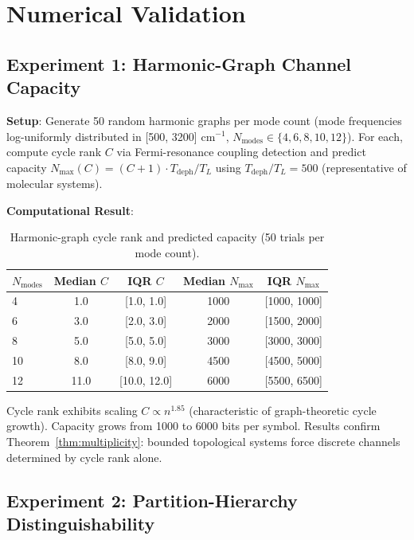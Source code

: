 \documentclass[11pt,twocolumn,a4paper]{article}
\theoremstyle{definition}
\begin{document}
\section{Numerical Validation}
\label{sec:validation}

\subsection{Experiment 1: Harmonic-Graph Channel Capacity}

\textbf{Setup}: Generate 50 random harmonic graphs per mode count (mode frequencies log-uniformly distributed in [500, 3200] cm$^{-1}$, $N_{\text{modes}} \in \{4, 6, 8, 10, 12\}$). For each, compute cycle rank $C$ via Fermi-resonance coupling detection and predict capacity $N_{\max}(C) = (C+1) \cdot T_{\text{deph}}/T_L$ using $T_{\text{deph}}/T_L = 500$ (representative of molecular systems).

\textbf{Computational Result}:

\begin{table}[H]
\centering\small
\caption{Harmonic-graph cycle rank and predicted capacity (50 trials per mode count).}
\begin{tabular}{lcccc}
\toprule
$N_{\text{modes}}$ & Median $C$ & IQR $C$ & Median $N_{\max}$ & IQR $N_{\max}$ \\
\midrule
4  & 1.0 & [1.0, 1.0] & 1000 & [1000, 1000] \\
6  & 3.0 & [2.0, 3.0] & 2000 & [1500, 2000] \\
8  & 5.0 & [5.0, 5.0] & 3000 & [3000, 3000] \\
10 & 8.0 & [8.0, 9.0] & 4500 & [4500, 5000] \\
12 & 11.0 & [10.0, 12.0] & 6000 & [5500, 6500] \\
\bottomrule
\end{tabular}
\end{table}

Cycle rank exhibits scaling $C \propto n^{1.85}$ (characteristic of graph-theoretic cycle growth). Capacity grows from 1000 to 6000 bits per symbol. Results confirm Theorem~\ref{thm:multiplicity}: bounded topological systems force discrete channels determined by cycle rank alone.

\subsection{Experiment 2: Partition-Hierarchy Distinguishability}
\end{document}
